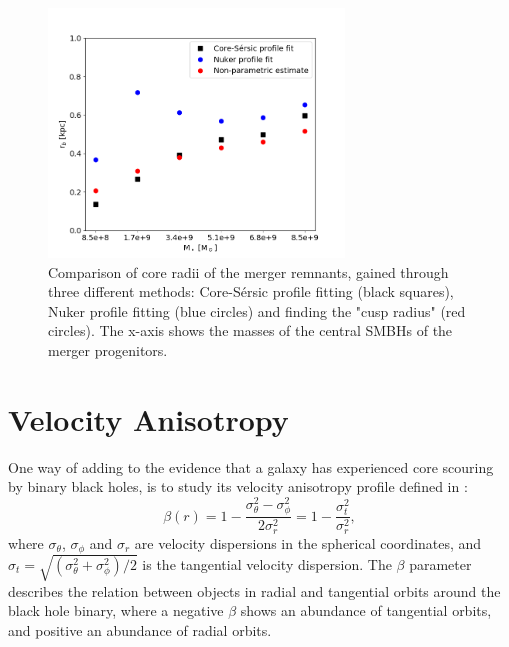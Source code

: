\documentclass[english, oneside]{HYgradu}
\begin{document}
\begin{figure}[h]
	\centering
	\includegraphics[width=0.7\textwidth]{rb_mass_relation.png}
	\caption{Comparison of core radii of the merger remnants, gained through three different methods: Core-Sérsic profile fitting (black squares), Nuker profile fitting (blue circles) and  finding the "cusp radius" (red circles). The x-axis shows the masses of the central SMBHs of the merger progenitors.}
	\label{figure:radii_comparison}
\end{figure}

\section{Velocity Anisotropy}


One way of adding to the evidence that a galaxy has experienced core scouring by binary black holes, is to study its velocity anisotropy profile defined in \cite{BinneyTremaine}:
\begin{equation}
\beta(r) = 1 - \frac{\sigma_\theta^2 - \sigma_\phi^2}{2\sigma_r^2} = 1 - \frac{\sigma_t^2}{\sigma_r^2}, \label{eq:beta}
\end{equation}
where $\sigma_\theta$, $\sigma_\phi$ and $\sigma_r$ are velocity dispersions in the spherical coordinates, and $\sigma_t = \sqrt{(\sigma_\theta^2 + \sigma_\phi^2) / 2}$ is the tangential velocity dispersion. The $\beta$ parameter describes the relation between objects in radial and tangential orbits around the black hole binary, where a negative $\beta$ shows an abundance of tangential orbits, and positive an abundance of radial orbits. 
\end{document}
